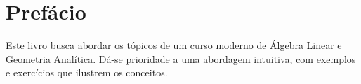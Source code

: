 
\chapter*{Prefácio}\label{prefacio}

Este livro busca abordar os tópicos de um curso moderno de Álgebra Linear e Geometria Analítica. Dá-se prioridade a uma abordagem intuitiva, com exemplos e exercícios que ilustrem os conceitos.
